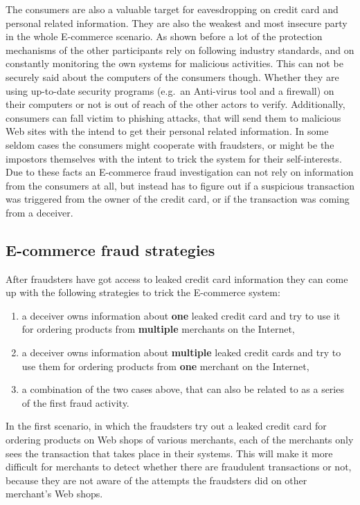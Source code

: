 The consumers are also a valuable target for eavesdropping on credit card and personal related information. They are also the weakest and most insecure party in the whole E-commerce scenario. As shown before a lot of the protection mechanisms of the other participants rely on following industry standards, and on constantly monitoring the own systems for malicious activities. This can not be securely said about the computers of the consumers though. Whether they are using up-to-date security programs (e.g.\ an Anti-virus tool and a firewall) on their computers or not is out of reach of the other actors to verify. Additionally, consumers can fall victim to phishing attacks, that will send them to malicious Web sites with the intend to get their personal related information. In some seldom cases the consumers might cooperate with fraudsters, or might be the impostors themselves with the intent to trick the system for their self-interests. Due to these facts an \gls{E-commerce} fraud investigation can not rely on information from the consumers at all, but instead has to figure out if a suspicious transaction was triggered from the owner of the credit card, or if the transaction was coming from a deceiver.


\subsection{E-commerce fraud strategies}
\label{subsec:strategies_fraudster}

After fraudsters have got access to leaked credit card information they can come up with the following strategies to trick the \gls{E-commerce} system:\@

\begin{enumerate}
  \item a deceiver owns information about \textbf{one} leaked credit card and try to use it for ordering products from \textbf{multiple} merchants on the Internet,
  \item a deceiver owns information about \textbf{multiple} leaked credit cards and try to use them for ordering products from \textbf{one} merchant on the Internet,
  \item a combination of the two cases above, that can also be related to as a series of the first fraud activity.
\end{enumerate}

In the first scenario, in which the fraudsters try out a leaked credit card for ordering products on Web shops of various merchants, each of the merchants only sees the transaction that takes place in their systems. This will make it more difficult for merchants to detect whether there are fraudulent transactions or not, because they are not aware of the attempts the fraudsters did on other merchant's Web shops. \\

